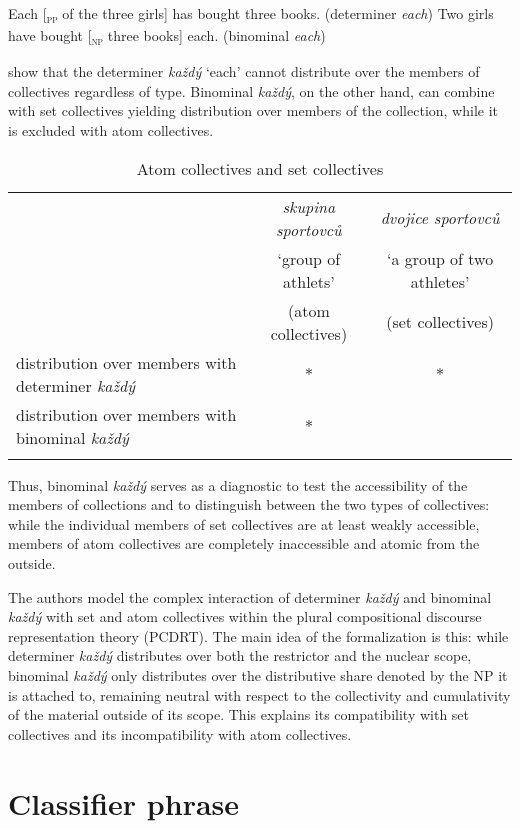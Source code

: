 \documentclass[output=paper]{langscibook}
\begin{document}
\ea \label{ex:12} \ea Each [\textsubscript{\textsc{pp}} of the three girls] has bought three books. \hfill (determiner \textit{each})\label{ex:12a}
\ex Two girls have bought [\textsubscript{\textsc{np}} three books] each. \hfill (binominal \textit{each})\label{ex:12b}
\z \z

\noindent \citeauthor{chapters/docekal} show that the determiner \textit{každý} `each' cannot distribute over the members of collectives regardless of type. Binominal \textit{každý}, on the other hand, can combine with set collectives yielding distribution over members of the collection, while it is excluded with atom collectives.

\begin{table}
\centering
\begin{tabularx}{\textwidth}{Qcc}
\lsptoprule
 & \textit{skupina sportovců} & \textit{dvojice sportovců} \tabularnewline
 & `group of athlets' & `a group of two athletes' \tabularnewline
 & (atom collectives) & (set collectives) \tabularnewline
\midrule
distribution over members with determiner \textit{každý} & $*$ & $*$ \tabularnewline
\midrule
distribution over members with binominal \textit{každý}  & $*$ &  \tabularnewline
\lspbottomrule
\end{tabularx}
\caption{Atom collectives and set collectives}
\label{table:3}
\end{table}

Thus, binominal \textit{každý} serves as a diagnostic to test the accessibility of the members of collections and to distinguish between the two types of collectives: while the individual members of set collectives are at least weakly accessible, members of atom collectives are completely inaccessible and atomic from the outside.

The authors model the complex interaction of determiner \textit{každý} and binominal \textit{každý} with set and atom collectives within the plural compositional discourse representation theory (PCDRT). The main idea of the formalization is this: while determiner \textit{každý} distributes over both the restrictor and the nuclear scope, binominal \textit{každý} only distributes over the distributive share denoted by the NP it is attached to, remaining neutral with respect to the collectivity and cumulativity of the material outside of its scope. This explains its compatibility with set collectives and its incompatibility with atom collectives.

\section{Classifier phrase}
\end{document}
